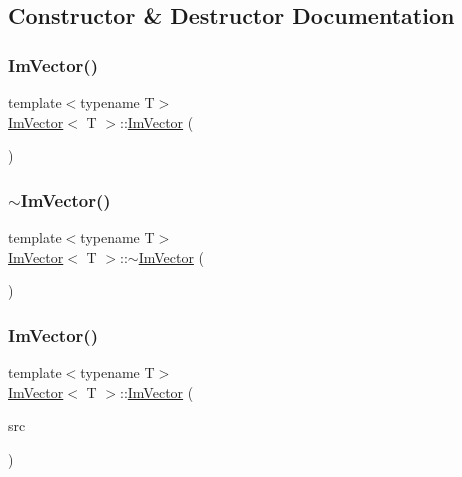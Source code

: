 \subsection{Constructor \& Destructor Documentation}
\mbox{\label{class_im_vector_a547fff373659fd848c3ecc6b25a83f25}} 
\subsubsection{\texorpdfstring{Im\+Vector()}{ImVector()}\hspace{0.1cm}{\footnotesize\ttfamily [1/2]}}
{\footnotesize\ttfamily template$<$typename T$>$ \\
\mbox{\hyperlink{class_im_vector}{Im\+Vector}}$<$ T $>$\+::\mbox{\hyperlink{class_im_vector}{Im\+Vector}} (\begin{DoxyParamCaption}{ }\end{DoxyParamCaption})\hspace{0.3cm}{\ttfamily [inline]}}

\mbox{\label{class_im_vector_a9b782359ca26eaa1a6a6138fcf341c54}} 
\subsubsection{\texorpdfstring{$\sim$\+Im\+Vector()}{~ImVector()}}
{\footnotesize\ttfamily template$<$typename T$>$ \\
\mbox{\hyperlink{class_im_vector}{Im\+Vector}}$<$ T $>$\+::$\sim$\mbox{\hyperlink{class_im_vector}{Im\+Vector}} (\begin{DoxyParamCaption}{ }\end{DoxyParamCaption})\hspace{0.3cm}{\ttfamily [inline]}}

\mbox{\label{class_im_vector_a6e2ee59d8b2fa1583617a2110a56aed4}} 
\subsubsection{\texorpdfstring{Im\+Vector()}{ImVector()}\hspace{0.1cm}{\footnotesize\ttfamily [2/2]}}
{\footnotesize\ttfamily template$<$typename T$>$ \\
\mbox{\hyperlink{class_im_vector}{Im\+Vector}}$<$ T $>$\+::\mbox{\hyperlink{class_im_vector}{Im\+Vector}} (\begin{DoxyParamCaption}\item[{const \mbox{\hyperlink{class_im_vector}{Im\+Vector}}$<$ T $>$ \&}]{src }\end{DoxyParamCaption})\hspace{0.3cm}{\ttfamily [inline]}}



